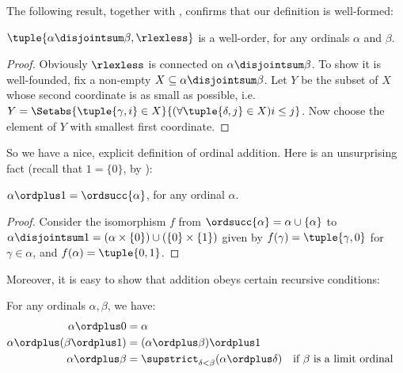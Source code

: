 \documentclass[../../../include/open-logic-section]{subfiles}
\begin{document}
The following result, together with
, confirms that our
definition is well-formed:

\begin{lem} 
$\tuple{\alpha \disjointsum \beta, \rlexless}$ is a well-order, for
any ordinals $\alpha$ and $\beta$.
\end{lem}

\begin{proof}
Obviously $\rlexless$ is connected on $\alpha \disjointsum \beta$. To
show it is well-founded, fix a non-empty $X \subseteq \alpha
\disjointsum \beta$. Let $Y$ be the subset of $X$ whose second coordinate is as small as possible, i.e.\ $Y = \Setabs{\tuple{\gamma, i} \in X}{(\forall \tuple{\delta, j} \in X)i \leq j}$. Now choose the element of $Y$ with smallest first coordinate. 
\end{proof}
\noindent 
So we have a nice, explicit definition of ordinal addition. Here is
an unsurprising fact (recall that  $1 = \{0\}$, by
):
\begin{prop}
$\alpha \ordplus  1 = \ordsucc{\alpha}$, for any ordinal $\alpha$.
\end{prop}

\begin{proof}
Consider the isomorphism $f$ from $\ordsucc{\alpha} = \alpha \cup
\{\alpha\}$ to $\alpha\disjointsum1 = (\alpha \times \{0\})
\cup (\{0\} \times \{1\})$ given by $f(\gamma) =
\tuple{\gamma, 0}$ for $\gamma \in \alpha$, and $f(\alpha) = \tuple{0,
1}$.
\end{proof}
\noindent
Moreover, it is easy to show that addition obeys certain recursive
conditions:

\begin{lem}
For any ordinals $\alpha, \beta$, we have:
\begin{align*}
	\alpha\ordplus 0 &= \alpha\\
	\alpha \ordplus  (\beta\ordplus 1) &= (\alpha \ordplus  \beta) \ordplus  1\\
	\alpha  \ordplus  \beta &= \supstrict_{\delta < \beta}(\alpha \ordplus  \delta) && \text{if $\beta $ is a limit ordinal}
\end{align*}
\end{lem}
\end{document}
